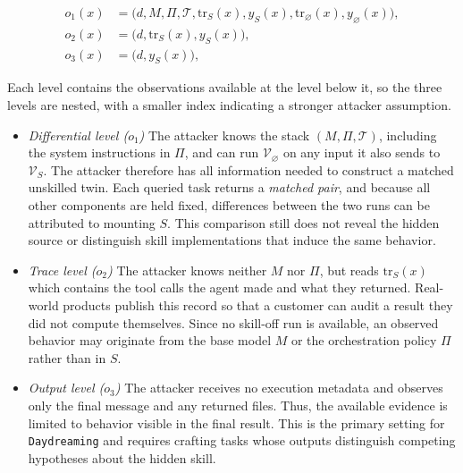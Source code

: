\documentclass[letterpaper,twocolumn,10pt]{article}
\newcommand{\method}{\texttt{Daydreaming}\xspace}
\newcommand{\trace}{\mathrm{tr}}
\begin{document}
\begin{align}
  o_1(x) &= \bigl(d,M,\Pi,\mathcal{T},
                  \trace_S(x),y_S(x),\trace_{\varnothing}(x),y_{\varnothing}(x)\bigr),
    \label{eq:obs-differential}\\
  o_2(x) &= \bigl(d,\trace_S(x),y_S(x)\bigr),
    \label{eq:obs-trace}\\
  o_3(x) &= \bigl(d,y_S(x)\bigr),
    \label{eq:obs-output}
\end{align}

Each level contains the observations available at the level below it, so the three levels are nested, with a smaller index indicating a stronger attacker assumption.

\vspace{5pt}

\begin{itemize}
    \item \emph{Differential level ($o_1$)}
    The attacker knows the stack $(M,\Pi,\mathcal{T})$, including the system instructions in $\Pi$, and can run $\mathcal{V}_{\varnothing}$ on any input it also sends to $\mathcal{V}_S$. The attacker therefore has all information needed to construct a matched unskilled twin. Each queried task returns a \emph{matched pair}, and because all other components are held fixed, differences between the two runs can be attributed to mounting $S$. This comparison still does not reveal the hidden source or distinguish skill implementations that induce the same behavior.
    
    \item \emph{Trace level ($o_2$)}
    The attacker knows neither $M$ nor $\Pi$, but reads $\trace_S(x)$ which contains the tool calls
    the agent made and what they returned.  Real-world products publish this record so that a
    customer can audit a result they did not compute themselves.  Since no skill-off run is available, an observed behavior may originate from the base
    model $M$ or the orchestration policy $\Pi$ rather than in $S$.
    
    \item \emph{Output level ($o_3$)}
    The attacker receives no execution metadata and observes only the final message and any returned files. Thus, the available evidence is limited to behavior visible in the final result. This is the primary setting for \method and requires crafting tasks whose outputs distinguish competing hypotheses about the hidden skill.
\end{itemize}
\end{document}
